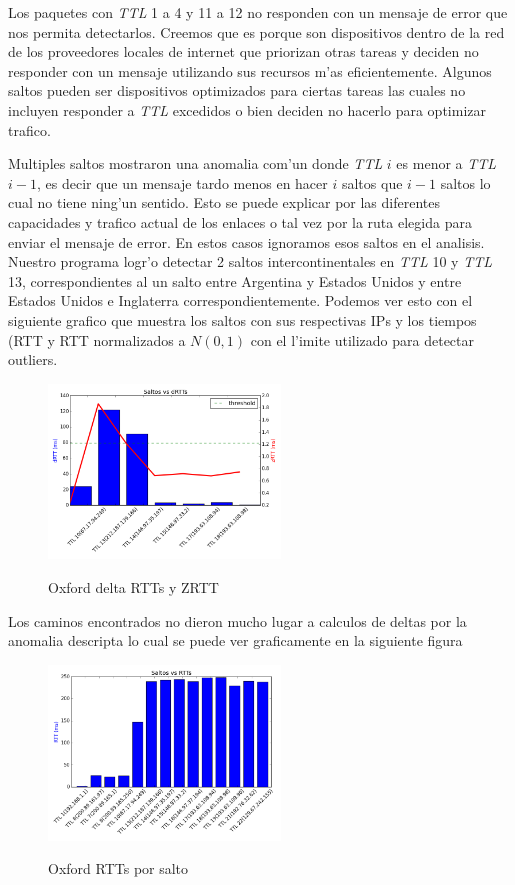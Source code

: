 \smallskip

Los paquetes con \textit{TTL} 1 a 4 y 11 a 12  no responden con un mensaje de error que nos permita detectarlos.
Creemos que es porque son dispositivos dentro de la red de los proveedores locales de internet que priorizan otras tareas y deciden no
responder con un mensaje utilizando sus recursos m'as eficientemente. Algunos saltos pueden ser dispositivos optimizados para ciertas tareas
las cuales no incluyen responder a \textit{TTL} excedidos o bien deciden no hacerlo para optimizar trafico. 

Multiples saltos mostraron una anomalia com'un donde \textit{TTL} $i$ es menor a \textit{TTL} $i-1$, es decir que un mensaje tardo menos en hacer $i$ saltos
que $i-1$ saltos lo cual no tiene ning'un sentido. Esto se puede explicar por las diferentes capacidades y trafico actual de los enlaces o tal vez por
la ruta elegida para enviar el mensaje de error. En estos casos ignoramos esos saltos en el analisis. \\

Nuestro programa logr'o detectar 2 saltos intercontinentales en \textit{TTL} 10 y \textit{TTL} 13, correspondientes al un salto entre Argentina y Estados Unidos y
entre Estados Unidos e Inglaterra correspondientemente.
Podemos ver esto con el siguiente grafico que muestra los saltos con sus respectivas IPs y los tiempos (RTT y RTT normalizados a $N(0,1)$ con el l'imite
utilizado para detectar outliers.

\begin{figure}[H]
\centering
\caption{Oxford delta RTTs y ZRTT}
\includegraphics[width=0.55\textwidth]{modules/oxford_rtts_2}
 \label{fig:oxford_rtts_2}
\end{figure}

Los caminos encontrados no dieron mucho lugar a calculos de deltas por la anomalia descripta lo cual se puede ver graficamente en la siguiente figura
\begin{figure}[H]
\centering
\caption{Oxford RTTs por salto}
\includegraphics[width=0.55\textwidth]{modules/oxford_rtts_1}
 \label{fig:oxford_rtts}
\end{figure}


